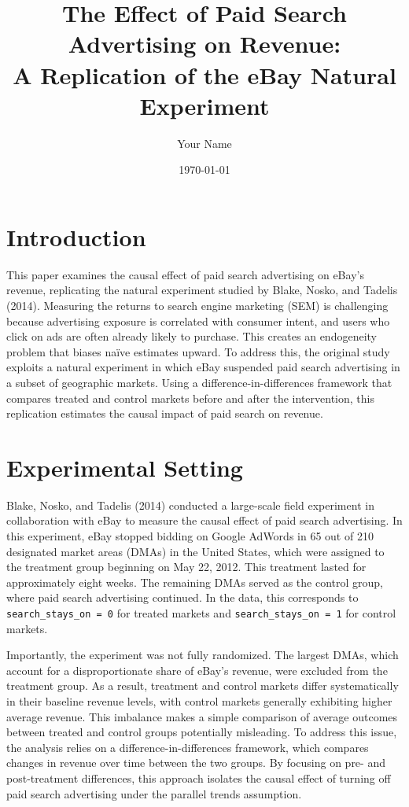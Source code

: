 \documentclass[12pt]{article}
\title{The Effect of Paid Search Advertising on Revenue: \\
A Replication of the eBay Natural Experiment}
\author{Your Name}
\date{\today}
\begin{document}
\maketitle

\section{Introduction}
This paper examines the causal effect of paid search advertising on eBay’s revenue, replicating the natural experiment studied by Blake, Nosko, and Tadelis (2014). Measuring the returns to search engine marketing (SEM) is challenging because advertising exposure is correlated with consumer intent, and users who click on ads are often already likely to purchase. This creates an endogeneity problem that biases naïve estimates upward. To address this, the original study exploits a natural experiment in which eBay suspended paid search advertising in a subset of geographic markets. Using a difference-in-differences framework that compares treated and control markets before and after the intervention, this replication estimates the causal impact of paid search on revenue.

\section{Experimental Setting}
Blake, Nosko, and Tadelis (2014) conducted a large-scale field experiment in collaboration with eBay to measure the causal effect of paid search advertising. In this experiment, eBay stopped bidding on Google AdWords in 65 out of 210 designated market areas (DMAs) in the United States, which were assigned to the treatment group beginning on May 22, 2012. This treatment lasted for approximately eight weeks. The remaining DMAs served as the control group, where paid search advertising continued. In the data, this corresponds to \texttt{search\_stays\_on = 0} for treated markets and \texttt{search\_stays\_on = 1} for control markets.

Importantly, the experiment was not fully randomized. The largest DMAs, which account for a disproportionate share of eBay’s revenue, were excluded from the treatment group. As a result, treatment and control markets differ systematically in their baseline revenue levels, with control markets generally exhibiting higher average revenue. This imbalance makes a simple comparison of average outcomes between treated and control groups potentially misleading. To address this issue, the analysis relies on a difference-in-differences framework, which compares changes in revenue over time between the two groups. By focusing on pre- and post-treatment differences, this approach isolates the causal effect of turning off paid search advertising under the parallel trends assumption.
\end{document}
